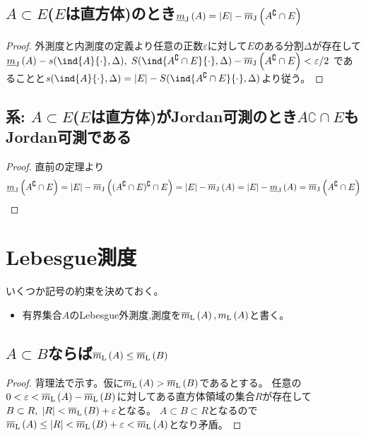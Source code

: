         \subsection{\texorpdfstring{$A\subset E$}{A⊂E}(\texorpdfstring{$E$}{E}は直方体)のとき\texorpdfstring{$\protect\underline{m}_\textrm{J}\left(A\right) = |E| - \protect\overline{m}_\textrm{J}\left(A^\complement\cap E\right)$}{mJi(A) = |E| - mJo(A\string^∁ ∩ E)}}
            \begin{proof}
                \quad\par
                外測度と内測度の定義より任意の正数$\varepsilon$に対して$E$のある分割$\Delta$が存在して$\mJi{A} - s(\ind{A}{\cdot},\Delta),\;S(\ind{A^\complement\cap E}{\cdot},\Delta) - \mJo{A^\complement\cap E} < \varepsilon/2$
                であることと$s(\ind{A}{\cdot},\Delta) = |E| - S(\ind{A^\complement\cap E}{\cdot},\Delta)$より従う。
            \end{proof}
        \subsection{系: \texorpdfstring{$A\subset E$}{A⊂E}(\texorpdfstring{$E$}{E}は直方体)がJordan可測のとき\texorpdfstring{$A\complement\cap E$}{A\string^∁ ∩ E}もJordan可測である}
            \label{subsec: Jordan可測集合の補集合もJordan可測}
            \begin{proof}
                \quad\par
                直前の定理より
                \[ \protect\underline{m}_\textrm{J}\left(A^\complement\cap E\right) = |E| - \protect\overline{m}_\textrm{J}\left((A^\complement\cap E)^\complement\cap E\right) = |E| - \protect\overline{m}_\textrm{J}\left(A\right) = |E| - \protect\underline{m}_\textrm{J}\left(A\right) = \protect\overline{m}_\textrm{J}\left(A^\complement\cap E\right) \]
            \end{proof}
    \section{Lebesgue測度}
        \newcommand*{\mLebO}[1]{\protect\overline{m}_\textrm{L}\left(#1\right)}
        \newcommand*{\mLeb}[1]{m_\textrm{L}\left(#1\right)}
        いくつか記号の約束を決めておく。
        \begin{itemize}
            \item 有界集合$A$のLebesgue外測度,測度を$\mLebO{A}, \mLeb{A}$と書く。
        \end{itemize}
        \subsection{\texorpdfstring{$A\subset B$}{A⊂B}ならば\texorpdfstring{$\mLebO{A}\leq\mLebO{B}$}{mLo(A)<mLo(B)}}
            \begin{proof}
                \quad\par
                背理法で示す。仮に$\mLebO{A} > \mLebO{B}$であるとする。
                任意の$0 < \varepsilon < \mLebO{A} - \mLebO{B}$に対してある直方体領域の集合$R$が存在して$B\subset R,\;|R| < \mLebO{B} + \varepsilon$となる。
                $A\subset B\subset R$となるので$\mLebO{A} \leq |R| < \mLebO{B} + \varepsilon < \mLebO{A}$となり矛盾。
            \end{proof}
